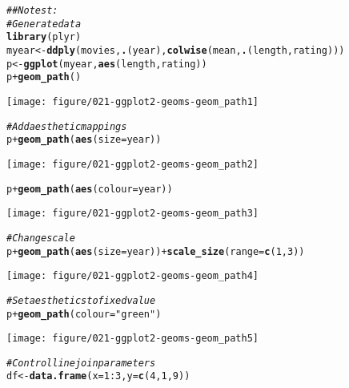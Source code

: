 \documentclass[a4paper,titlepage]{tufte-handout}\usepackage[]{graphicx}\usepackage[]{color}
\makeatletter
\def\maxwidth{ %
  \ifdim\Gin@nat@width>\linewidth
    \linewidth
  \else
    \Gin@nat@width
  \fi
}
\newcommand{\hlnum}[1]{\textcolor[rgb]{0.686,0.059,0.569}{#1}}%
\newcommand{\hlstr}[1]{\textcolor[rgb]{0.192,0.494,0.8}{#1}}%
\newcommand{\hlcom}[1]{\textcolor[rgb]{0.678,0.584,0.686}{\textit{#1}}}%
\newcommand{\hlopt}[1]{\textcolor[rgb]{0,0,0}{#1}}%
\newcommand{\hlstd}[1]{\textcolor[rgb]{0.345,0.345,0.345}{#1}}%
\newcommand{\hlkwb}[1]{\textcolor[rgb]{0.69,0.353,0.396}{#1}}%
\newcommand{\hlkwc}[1]{\textcolor[rgb]{0.333,0.667,0.333}{#1}}%
\newcommand{\hlkwd}[1]{\textcolor[rgb]{0.737,0.353,0.396}{\textbf{#1}}}%
\newenvironment{kframe}{%
 \def\at@end@of@kframe{}%
 \ifinner\ifhmode%
  \def\at@end@of@kframe{\end{minipage}}%
  \begin{minipage}{\columnwidth}%
 \fi\fi%
 \def\FrameCommand##1{\hskip\@totalleftmargin \hskip-\fboxsep
 \colorbox{shadecolor}{##1}\hskip-\fboxsep
     \hskip-\linewidth \hskip-\@totalleftmargin \hskip\columnwidth}%
 \MakeFramed {\advance\hsize-\width
   \@totalleftmargin\z@ \linewidth\hsize
   \@setminipage}}%
 {\par\unskip\endMakeFramed%
 \at@end@of@kframe}
\newenvironment{knitrout}{}{} %
\makeatother
\begin{document}
\begin{knitrout}
\begin{kframe}
\begin{alltt}
\hlcom{## No test: }
\hlcom{# Generate data}
\hlkwd{library}\hlstd{(plyr)}
\hlstd{myear} \hlkwb{<-} \hlkwd{ddply}\hlstd{(movies,} \hlkwd{.}\hlstd{(year),} \hlkwd{colwise}\hlstd{(mean,} \hlkwd{.}\hlstd{(length, rating)))}
\hlstd{p} \hlkwb{<-} \hlkwd{ggplot}\hlstd{(myear,} \hlkwd{aes}\hlstd{(length, rating))}
\hlstd{p} \hlopt{+} \hlkwd{geom_path}\hlstd{()}
\end{alltt}
\end{kframe}
\texttt{[image: figure/021-ggplot2-geoms-geom\_path1]} 
\begin{kframe}\begin{alltt}
\hlcom{# Add aesthetic mappings}
\hlstd{p} \hlopt{+} \hlkwd{geom_path}\hlstd{(}\hlkwd{aes}\hlstd{(}\hlkwc{size} \hlstd{= year))}
\end{alltt}
\end{kframe}
\texttt{[image: figure/021-ggplot2-geoms-geom\_path2]} 
\begin{kframe}\begin{alltt}
\hlstd{p} \hlopt{+} \hlkwd{geom_path}\hlstd{(}\hlkwd{aes}\hlstd{(}\hlkwc{colour} \hlstd{= year))}
\end{alltt}
\end{kframe}
\texttt{[image: figure/021-ggplot2-geoms-geom\_path3]} 
\begin{kframe}\begin{alltt}
\hlcom{# Change scale}
\hlstd{p} \hlopt{+} \hlkwd{geom_path}\hlstd{(}\hlkwd{aes}\hlstd{(}\hlkwc{size} \hlstd{= year))} \hlopt{+} \hlkwd{scale_size}\hlstd{(}\hlkwc{range} \hlstd{=} \hlkwd{c}\hlstd{(}\hlnum{1}\hlstd{,} \hlnum{3}\hlstd{))}
\end{alltt}
\end{kframe}
\texttt{[image: figure/021-ggplot2-geoms-geom\_path4]} 
\begin{kframe}\begin{alltt}
\hlcom{# Set aesthetics to fixed value}
\hlstd{p} \hlopt{+} \hlkwd{geom_path}\hlstd{(}\hlkwc{colour} \hlstd{=} \hlstr{"green"}\hlstd{)}
\end{alltt}
\end{kframe}
\texttt{[image: figure/021-ggplot2-geoms-geom\_path5]} 
\begin{kframe}\begin{alltt}
\hlcom{# Control line join parameters}
\hlstd{df} \hlkwb{<-} \hlkwd{data.frame}\hlstd{(}\hlkwc{x} \hlstd{=} \hlnum{1}\hlopt{:}\hlnum{3}\hlstd{,} \hlkwc{y} \hlstd{=} \hlkwd{c}\hlstd{(}\hlnum{4}\hlstd{,} \hlnum{1}\hlstd{,} \hlnum{9}\hlstd{))}

\end{alltt}
\end{kframe}
\end{knitrout}
\end{document}
